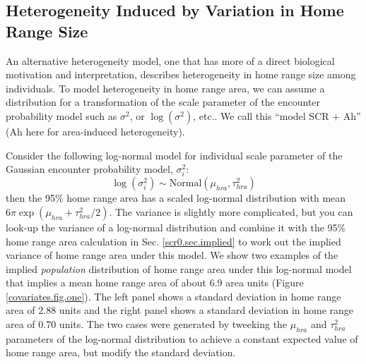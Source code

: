 \subsection{Heterogeneity Induced by Variation in Home Range Size} 
\label{covariates.sec.heterogeneityHR}

An alternative heterogeneity model, one that has more of a direct
biological motivation and interpretation, describes heterogeneity in
home range size among individuals.
To model heterogeneity in home range
area, we can  assume a distribution for
a transformation of the scale
parameter of the encounter  probability model such as $\sigma^{2}$, or
$\log(\sigma^2)$, etc..
We call this 
``model SCR + Ah'' (Ah here for area-induced heterogeneity).

Consider the following log-normal model for individual scale parameter
of the Gaussian encounter probability model, $\sigma_{i}^{2}$:
\[
 \log(\sigma^{2}_{i}) \sim \mbox{Normal}(\mu_{hra}, \tau^{2}_{hra})
\]
then the 95\% home range area has a scaled
log-normal distribution with mean $6 \pi \exp(\mu_{hra} +
\tau^{2}_{hra}/2)$. The variance is slightly more complicated, but you
can look-up  the variance of a log-normal distribution and combine it
with the 95\% home range area calculation in
Sec. \ref{scr0.sec.implied} to work out the implied variance of home
range area under this model.
We show two examples of the implied {\it population} distribution of
home range area under this log-normal model that implies 
 a mean home range area of about 6.9 area units (Figure
\ref{covariates.fig.one}). The left panel shows a standard deviation
in home range area of 2.88 units and the right panel shows a standard
deviation in home range area of 0.70 units. The two cases were
generated by tweeking the $\mu_{hra}$ and $\tau^{2}_{hra}$ parameters
of the log-normal distribution to achieve a constant expected value of
home range area, but modify the standard deviation. 




